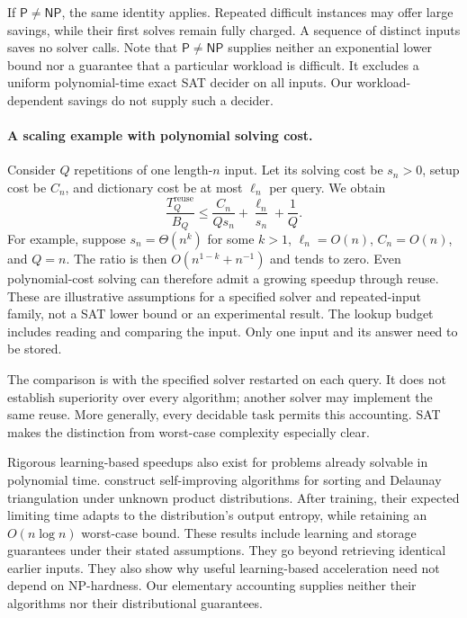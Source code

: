 \documentclass[11pt,a4paper]{article}
\numberwithin{equation}{section}
\newcommand{\Pclass}{\mathsf{P}}
\newcommand{\NPclass}{\mathsf{NP}}
\theoremstyle{plain}
\theoremstyle{definition}
\theoremstyle{remark}
\begin{document}
If $\Pclass\neq\NPclass$, the same identity applies. Repeated difficult instances may offer large savings, while their first solves remain fully charged. A sequence of distinct inputs saves no solver calls. Note that $\Pclass\neq\NPclass$ supplies neither an exponential lower bound nor a guarantee that a particular workload is difficult. It excludes a uniform polynomial-time exact SAT decider on all inputs. Our workload-dependent savings do not supply such a decider.

\paragraph{A scaling example with polynomial solving cost.}
Consider $Q$ repetitions of one length-$n$ input. Let its solving cost be $s_n>0$, setup cost be $C_n$, and dictionary cost be at most $\ell_n$ per query. We obtain
\begin{equation}
\frac{T_Q^{\mathrm{reuse}}}{B_Q}
\leq \frac{C_n}{Qs_n}+\frac{\ell_n}{s_n}+\frac{1}{Q}.
\label{eq:reuse-ratio}
\end{equation}
For example, suppose $s_n=\Theta(n^k)$ for some $k>1$, $\ell_n=O(n)$, $C_n=O(n)$, and $Q=n$. The ratio is then $O(n^{1-k}+n^{-1})$ and tends to zero. Even polynomial-cost solving can therefore admit a growing speedup through reuse. These are illustrative assumptions for a specified solver and repeated-input family, not a SAT lower bound or an experimental result. The lookup budget includes reading and comparing the input. Only one input and its answer need to be stored.

The comparison is with the specified solver restarted on each query. It does not establish superiority over every algorithm; another solver may implement the same reuse. More generally, every decidable task permits this accounting. SAT makes the distinction from worst-case complexity especially clear.

Rigorous learning-based speedups also exist for problems already solvable in polynomial time. \citet{ailon2011self} construct self-improving algorithms for sorting and Delaunay triangulation under unknown product distributions. After training, their expected limiting time adapts to the distribution's output entropy, while retaining an $O(n\log n)$ worst-case bound. These results include learning and storage guarantees under their stated assumptions. They go beyond retrieving identical earlier inputs. They also show why useful learning-based acceleration need not depend on NP-hardness. Our elementary accounting supplies neither their algorithms nor their distributional guarantees.
\end{document}
